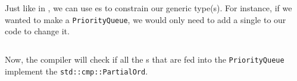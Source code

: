 Just like in , we can use es to constrain our generic type(s).
For instance, if we wanted to make a \texttt{PriorityQueue}, we would only need to add a single  to our \texttt{} code to change it.
\inputminted[frame=lines,linenos]{rust}{./EDAP05-Concepts_Programming_Languages-Sections/Abstract_Data_Types/Code/PriorityQueue.rs}

Now, the compiler will check if all the s that are fed into the \texttt{PriorityQueue} implement the  \texttt{std::cmp::PartialOrd}.





